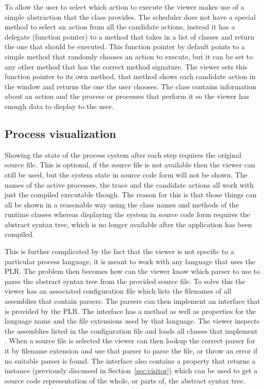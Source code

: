   To allow the user to select which action to execute the viewer makes use of
  a simple abstraction that the  class provides. The scheduler
  does not have a special method to select an action from all the candidate 
  actions, instead it has a delegate (function pointer) to a method that takes
  in a list of  classes and return the one that should be
  executed. This function pointer by default points to a simple method that 
  randomly chooses an action to execute, but it can be set to any other method
  that has the correct method signature. The viewer sets this function pointer
  to its own method, that method shows each candidate action in the window and
  returns the one the user chooses. The  class contains
  information about an action and the process or processes that perform it so
  the viewer has enough data to display to the user.

  \subsection{Process visualization}\label{sec:process_visualization}
	
	Showing the state of the process system after each step requires the original
	source file. This is optional, if the source file is not available then the
	viewer can still be used, but the system state in source code form will not
	be shown. The names of the active processes, the trace and the candidate 
	actions all work with just the compiled executable though. The reason for 
	this is that those things can all be shown in a reasonable way using the 
	class names and  methods of the runtime classes whereas 
	displaying the system in source code form  requires the abstract syntax 
	tree, which is no longer available after the application has been compiled. 
	
	This is further complicated by the fact that the viewer is not specific to 
	a particular process language, it is meant to work with any language that 
	uses the PLR. The problem then becomes how can the viewer know which parser 
	to use to parse the abstract syntax tree from the provided source file. To 
	solve this the viewer has an associated configuration file which lists the 
	filenames of all assemblies that contain parsers. The parsers can then 
	implement an  interface that is provided by the PLR. The 
	interface has a  method as well as properties for the language 
	name and the file extensions used by that language. The viewer inspects the 
	assemblies listed in the configuration file and loads all classes that 
	implement . When a source file is selected the viewer can then 
	lookup the correct parser for it by filename extension and use that parser 
	to parse the file, or throw an error if no suitable parser is found. The 
	 interface also contains a property that returns a 
	 instance (previously discussed in 
	Section~\ref{sec:visitor}) which can be used to get a source code
	representation of the whole, or parts of, the abstract syntax tree.
	
